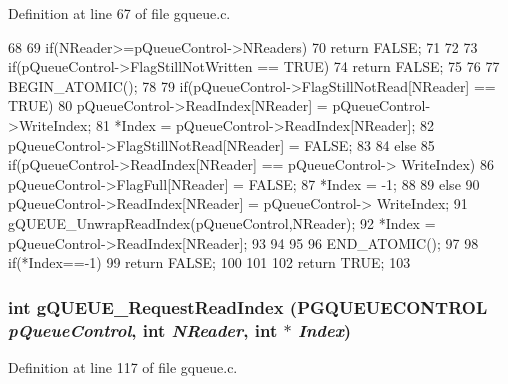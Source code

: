 Definition at line 67 of file gqueue.c.


\begin{DoxyCode}
68 {
69         if(NReader>=pQueueControl->NReaders){
70                 return FALSE;
71         }
72         
73         if(pQueueControl->FlagStillNotWritten == TRUE){
74                 return FALSE;
75         }
76 
77 BEGIN_ATOMIC();
78         
79         if(pQueueControl->FlagStillNotRead[NReader] == TRUE){
80                 pQueueControl->ReadIndex[NReader] = pQueueControl->WriteIndex;
81                 *Index = pQueueControl->ReadIndex[NReader];
82                 pQueueControl->FlagStillNotRead[NReader] = FALSE;
83         }
84         else{
85                 if(pQueueControl->ReadIndex[NReader] == pQueueControl->
      WriteIndex){
86                         pQueueControl->FlagFull[NReader] = FALSE;       
87                         *Index = -1;
88                 }
89                 else{
90                         pQueueControl->ReadIndex[NReader] = pQueueControl->
      WriteIndex;
91                         gQUEUE_UnwrapReadIndex(pQueueControl,NReader);
92                         *Index = pQueueControl->ReadIndex[NReader];
93                 }
94         }
95 
96 END_ATOMIC();
97 
98         if(*Index==-1){
99                 return FALSE;
100         }  
101 
102     return TRUE;
103 }                      
\end{DoxyCode}
\subsubsection[{gQUEUE\_\-RequestReadIndex}]{\setlength{\rightskip}{0pt plus 5cm}int gQUEUE\_\-RequestReadIndex ({\bf PGQUEUECONTROL} {\em pQueueControl}, \/  int {\em NReader}, \/  int $\ast$ {\em Index})}\label{gqueue_8h_ab5ba087de92285fb4f9ed8c46440ac6f}


Definition at line 117 of file gqueue.c.



